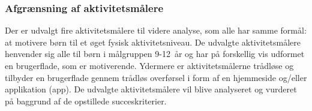 \subsubsection{Afgrænsning af aktivitetsmålere}  %
Der er udvalgt fire aktivitetsmålere til videre analyse, som alle har samme formål: at motivere børn til et øget fysisk aktivitetsniveau. De udvalgte aktivitetsmålere henvender sig alle til børn i målgruppen 9-12~år og har på forskellig vis udformet en brugerflade, som er motiverende. Ydermere er aktivitetsmålerne trådløse og tilbyder en brugerflade gennem trådløs overførsel i form af en hjemmeside og/eller applikation (app). \newline
De udvalgte aktivitetsmålere vil blive analyseret og vurderet på baggrund af de opstillede succeskriterier.

